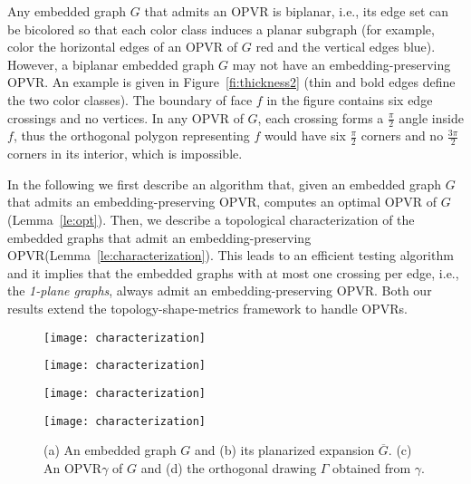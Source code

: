 \documentclass{article}
\newcommand{\ph}{\frac{\pi}{2}}
\newcommand{\pt}{\frac{3\pi}{2}}
\newcommand{\opvr}{OPVR\xspace}
\newcommand{\bG}{\overline{G}}
\begin{document}
Any embedded graph $G$ that admits an \opvr is biplanar, i.e., its edge set can be bicolored so that each color class induces a planar subgraph (for example, color the horizontal edges of an \opvr of $G$ red and the vertical edges blue). However, a biplanar embedded graph $G$ may not have an embedding-preserving \opvr. An example is given in Figure~\ref{fi:thickness2} (thin and bold edges define the two color classes). The boundary of face $f$ in the figure contains six edge crossings and no vertices. In any \opvr of $G$, each crossing forms a $\ph$ angle inside $f$, thus the orthogonal polygon representing $f$ would have six $\ph$ corners and no $\pt$ corners in its interior, which is impossible.


In the following we first describe an algorithm that, given an embedded graph $G$ that admits an embedding-preserving \opvr, computes an optimal \opvr of $G$ (Lemma~\ref{le:opt}). Then, we describe a topological characterization of the embedded graphs that admit an embedding-preserving \opvr (Lemma~\ref{le:characterization}). This leads to an efficient testing algorithm and it implies that the embedded graphs with at most one crossing per edge, i.e., the \emph{1-plane graphs}, always admit an embedding-preserving \opvr. Both our results extend the topology-shape-metrics framework to handle {\opvr}s. 
 

\begin{figure}[tb]
\centering
    \begin{minipage}[b]{.48\textwidth}
    	\centering
    	\texttt{[image: characterization]}
    	\label{fi:characterization-1}
    \end{minipage}
    \begin{minipage}[b]{.48\textwidth}
    	\centering
    	\texttt{[image: characterization]}
    	\subcaption{$\bG$}\label{fi:characterization-3}
    \end{minipage}
    \begin{minipage}[b]{.48\textwidth}
    	\centering
    	\texttt{[image: characterization]}
    	\subcaption{$\gamma$}\label{fi:characterization-5}
    \end{minipage}
    \begin{minipage}[b]{.48\textwidth}
    	\centering
    	\texttt{[image: characterization]}
    	\subcaption{$\Gamma$}\label{fi:characterization-6}
    \end{minipage}
    \caption{(a) An embedded graph $G$ and (b) its planarized expansion $\bG$.  (c) An \opvr $\gamma$ of $G$ and (d) the orthogonal drawing $\Gamma$ obtained from $\gamma$.}
\end{figure}
\end{document}
